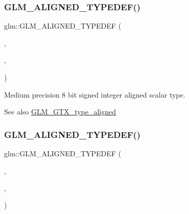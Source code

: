 \subsubsection{\texorpdfstring{G\+L\+M\+\_\+\+A\+L\+I\+G\+N\+E\+D\+\_\+\+T\+Y\+P\+E\+D\+E\+F()}{GLM\_ALIGNED\_TYPEDEF()}\hspace{0.1cm}{\footnotesize\ttfamily [13/209]}}
{\footnotesize\ttfamily glm\+::\+G\+L\+M\+\_\+\+A\+L\+I\+G\+N\+E\+D\+\_\+\+T\+Y\+P\+E\+D\+EF (\begin{DoxyParamCaption}\item[{\hyperlink{group__gtc__type__precision_ga3ee8faab2278c44c5785af04b7b18a14}{mediump\+\_\+int8}}]{,  }\item[{aligned\+\_\+mediump\+\_\+int8}]{,  }\item[{1}]{ }\end{DoxyParamCaption})}

Medium precision 8 bit signed integer aligned scalar type. \begin{DoxySeeAlso}{See also}
\hyperlink{group__gtx__type__aligned}{G\+L\+M\+\_\+\+G\+T\+X\+\_\+type\+\_\+aligned} 
\end{DoxySeeAlso}
\mbox{\label{group__gtx__type__aligned_ga78f443d88f438575a62b5df497cdf66b}} 
\subsubsection{\texorpdfstring{G\+L\+M\+\_\+\+A\+L\+I\+G\+N\+E\+D\+\_\+\+T\+Y\+P\+E\+D\+E\+F()}{GLM\_ALIGNED\_TYPEDEF()}\hspace{0.1cm}{\footnotesize\ttfamily [14/209]}}
{\footnotesize\ttfamily glm\+::\+G\+L\+M\+\_\+\+A\+L\+I\+G\+N\+E\+D\+\_\+\+T\+Y\+P\+E\+D\+EF (\begin{DoxyParamCaption}\item[{\hyperlink{group__gtc__type__precision_ga4611997edb6c61606daa11990cf08798}{mediump\+\_\+int16}}]{,  }\item[{aligned\+\_\+mediump\+\_\+int16}]{,  }\item[{2}]{ }\end{DoxyParamCaption})}

